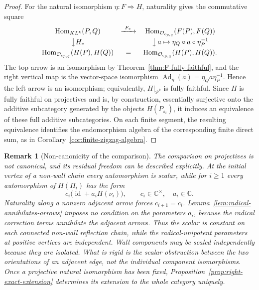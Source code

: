 \documentclass[12pt,leqno]{amsart}
\numberwithin{equation}{section}
\newtheorem{rmk}[thm]{Remark}
\newcommand{\Hom}{\operatorname{Hom}}
\newcommand{\id}{\operatorname{id}}
\newcommand{\KL}{KL}
\newcommand{\Oc}{\mathcal O}
\def\C{\mathbb{C}}
\begin{document}
\begin{proof}
For the natural isomorphism $\eta:F\Rightarrow H$, naturality gives the
commutative square
\[
\begin{array}{ccc}
 \Hom_{\KL^k}(P,Q) & \xrightarrow{\ F_*\ } & \Hom_{\Oc_{c_{p,q}}}(F(P),F(Q))\\[3pt]
 \big\downarrow {H_*} &&
 \big\downarrow {\,a\mapsto\eta_Q\circ a\circ\eta_P^{-1}}\\[3pt]
 \Hom_{\Oc_{c_{p,q}}}(H(P),H(Q)) & = & \Hom_{\Oc_{c_{p,q}}}(H(P),H(Q)).
\end{array}
\]
The top arrow is an isomorphism by Theorem~\ref{thm:F-fully-faithful},
and the right vertical map is the vector-space isomorphism
$\operatorname{Ad}_\eta(a)=\eta_Qa\eta_P^{-1}$.  Hence the left arrow is
an isomorphism; equivalently,
$H|_{\mathcal P^k}$ is fully faithful.  Since $H$ is fully faithful on projectives and is, by construction,
essentially surjective onto the additive subcategory generated by the
objects $H(P_{s_i})$, it induces an equivalence of these full additive
subcategories.  On each finite segment, the resulting equivalence
identifies the endomorphism algebra of the corresponding finite direct
sum, as in Corollary~\ref{cor:finite-zigzag-algebra}.
\end{proof}

\begin{rmk}[Non-canonicity of the comparison]
\label{rmk:comparison-noncanonical}
The comparison on projectives is not canonical, and its residual freedom
can be described explicitly.  At the initial vertex of a non-wall chain
every automorphism is scalar, while for $i\ge1$ every automorphism of
$H(\Pi_i)$ has the form
\[
 c_i\bigl(\id+a_iH(\nu_i)\bigr),
 \qquad c_i\in\C^\times,\quad a_i\in\C.
\]
Naturality along a nonzero adjacent arrow forces $c_{i+1}=c_i$.
Lemma~\ref{lem:radical-annihilates-arrows} imposes no condition on the
parameters $a_i$, because the radical correction terms annihilate the
adjacent arrows.  Thus the scalar is constant on each connected non-wall
reflection chain, while the radical-unipotent parameters at positive
vertices are independent.  Wall components may be scaled independently
because they are isolated.  What is rigid is the scalar obstruction
between the two orientations of an adjacent edge, not the individual
component isomorphisms.  Once a projective natural isomorphism has been
fixed, Proposition~\ref{prop:right-exact-extension} determines its
extension to the whole category uniquely.
\end{rmk}
\end{document}
